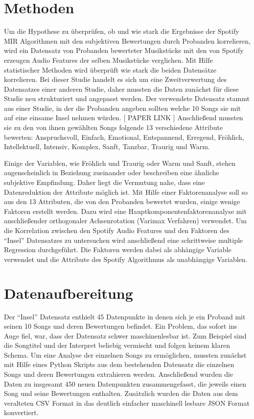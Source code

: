 \section*{Methoden}
\label{sec:Methoden}

Um die Hypothese zu überprüfen, ob und wie stark die Ergebnisse der Spotify MIR Algorithmen mit den subjektiven Bewertungen durch Probanden korrelieren, wird ein Datensatz von Probanden bewerteter Musikstücke mit den von Spotify erzeugen Audio Features der selben Musikstücke verglichen.
Mit Hilfe statistischer Methoden wird überprüft wie stark die beiden Datensätze korrelieren.
Bei dieser Studie handelt es sich um eine Zweitverwertung des Datensatzes einer anderen Studie, daher mussten die Daten zunächst für diese Studie neu strukturiert und angepasst werden.
Der verwendete Datensatz stammt aus einer Studie, in der die Probanden angeben sollten welche 10 Songs sie mit auf eine einsame Insel nehmen würden. [ PAPER LINK ]
Anschließend mussten sie zu den von ihnen gewählten Songs folgende 13 verschiedene Attribute bewerten: Anspruchsvoll, Einfach, Emotional, Entspannend, Erregend, Fröhlich, Intellektuell, Intensiv, Komplex, Sanft, Tanzbar, Traurig und Warm.

Einige der Variablen, wie Fröhlich und Traurig oder Warm und Sanft, stehen augenscheinlich in Beziehung zueinander oder beschreiben eine ähnliche subjektive Empfindung.
Daher liegt die Vermutung nahe, dass eine Datenreduktion der Attribute möglich ist.
Mit Hilfe einer Faktorenanalyse soll so aus den 13 Attributen, die von den Probanden bewertet wurden, einige wenige Faktoren erstellt werden.
Dazu wird eine Hauptkomponentenfaktorenanalyse mit anschließender orthogonaler Achsenrotation (Varimax Verfahren) verwendet.
Um die Korrelation zwischen den Spotify Audio Features und den Faktoren des "`Insel"' Datensatzes zu untersuchen wird anschließend eine schrittweise multiple Regression durchgeführt.
Die Faktoren werden dabei als abhängige Variable verwendet und die Attribute des Spotify Algorithmus als unabhängige Variablen.



\section*{Datenaufbereitung}
\label{sec:Datenaufbereitung}


Der "`Insel"' Datensatz enthielt 45 Datenpunkte in denen sich je ein Proband mit seinen 10 Songs und deren Bewertungen befindet.
Ein Problem, das sofort ins Auge fiel, war, dass der Datensatz schwer maschinenlesbar ist. 
Zum Beispiel sind die Songtitel und der Interpret beliebig vermischt und folgen keinem klaren Schema.
Um eine Analyse der einzelnen Songs zu ermöglichen, mussten zunächst mit Hilfe eines Python Skripts aus dem bestehenden Datensatz die einzelnen Songs und deren Bewertungen extrahieren werden.
Anschließend wurden die Daten zu insgesamt 450 neuen Datenpunkten zusammengefasst, die jeweils einen Song und seine Bewertungen enthalten.
Zusätzlich wurden die Daten aus dem veralteten CSV Format in das deutlich einfacher maschinell lesbare JSON Format konvertiert.

